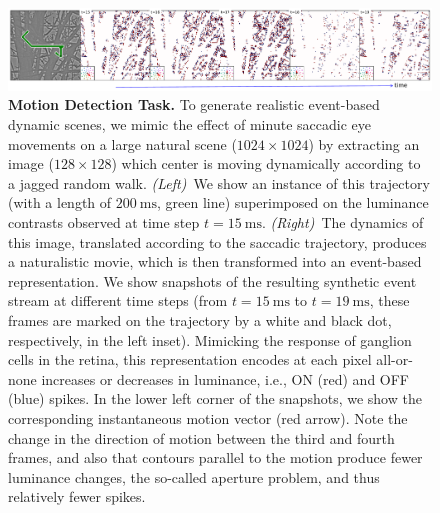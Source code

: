 \documentclass[default]{sn-jnl}%
\theoremstyle{thmstyleone}%
\theoremstyle{thmstyletwo}%
\theoremstyle{thmstylethree}%
\newcommand{\ms}{\si{\milli\second}}%
\begin{document}
\begin{figure}%
    \centering
    \includegraphics[width=0.95\linewidth]{figures/motion_task.pdf}
    \caption{
        {\bf Motion Detection Task.} To generate realistic event-based dynamic scenes, we mimic the effect of minute saccadic eye movements on a large natural scene ($1024\times1024$) by extracting an image ($128\times128$) which center is moving dynamically according to a jagged random walk. \textit{(Left)}~We show an instance of this trajectory (with a length of $200~\ms$, green line) superimposed on the luminance contrasts observed at time step $t=15~\ms$. \textit{(Right)}~The dynamics of this image, translated according to the saccadic trajectory, produces a naturalistic movie, which is then transformed into an event-based representation. We show snapshots of the resulting synthetic event stream at different time steps (from $t=15~\ms$ to $t=19~\ms$, these frames are marked on the trajectory by a white and black dot, respectively, in the left inset). Mimicking the response of ganglion cells in the retina, this representation encodes at each pixel all-or-none increases or decreases in luminance, i.e., ON (red) and OFF (blue) spikes. In the lower left corner of the snapshots, we show the corresponding instantaneous motion vector (red arrow). Note the change in the direction of motion between the third and fourth frames, and also that contours parallel to the motion produce fewer luminance changes, the so-called aperture problem, and thus relatively fewer spikes.
        }
    \label{fig:motion_task}
\end{figure}
\end{document}
